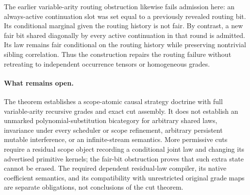 \documentclass[11pt]{article}
\begin{document}
The earlier variable-arity routing obstruction likewise fails admission here: an always-active continuation slot was set equal to a previously revealed routing bit. Its conditional marginal given the routing history is not fair. By contrast, a new fair bit shared diagonally by every active continuation in that round is admitted. Its law remains fair conditional on the routing history while preserving nontrivial sibling correlation. Thus the construction repairs the routing failure without retreating to independent occurrence tensors or homogeneous grades.

\paragraph{What remains open.}
The theorem establishes a scope-atomic causal strategy doctrine with full variable-arity recursive grades and exact cut assembly. It does not establish an unmarked polynomial-substitution bicategory for arbitrary shared laws, invariance under every scheduler or scope refinement, arbitrary persistent mutable interference, or an infinite-stream semantics. More permissive cuts require a residual scope object recording a conditional joint law and changing its advertised primitive kernels; the fair-bit obstruction proves that such extra state cannot be erased. The required dependent residual-law compiler, its native coefficient semantics, and its compatibility with unrestricted original grade maps are separate obligations, not conclusions of the cut theorem.
\end{document}
